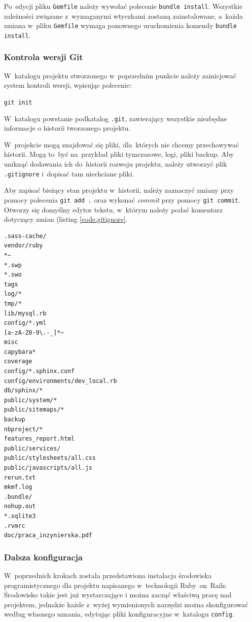 Po~edycji pliku \texttt{Gemfile} należy wywołać polecenie \texttt{bundle install}. Wszystkie zależności związane z~wymaganymi wtyczkami zostaną zainstalowane, a~każda zmiana w~pliku \texttt{Gemfile} wymaga ponownego uruchomienia komendy \texttt{bundle install}.

\subsubsection{Kontrola wersji Git}

W~katalogu projektu stworzonego w~poprzednim punkcie należy zainicjować system kontroli wersji, wpisując polecenie:


\verb+git init+


W~katalogu powstanie podkatalog \verb+.git+, zawierający wszystkie niezbędne informacje o historii tworzonego projektu.


W~projekcie mogą znajdować się pliki, dla~których nie chcemy przechowywać historii. Mogą to~być na~przykład pliki tymczasowe, logi, pliki backup. Aby uniknąć dodawania ich do~historii rozwoju projektu, należy utworzyć plik \texttt{.gitignore} i~dopisać tam niechciane pliki.


Aby zapisać bieżący stan projektu w~historii, należy zaznaczyć zmiany przy pomocy polecenia \verb+git add .+ oraz wykonać \textit{commit} przy pomocy \verb+git commit+. Otworzy się domyślny edytor tekstu, w~którym należy podać komentarz dotyczący zmian (listing \ref{code.gitignore}.

\begin{lstlisting}[label={code.gitignore}]
.sass-cache/
vendor/ruby
*~
*.swp
*.swo
tags
log/*
tmp/*
lib/mysql.rb
config/*.yml
[a-zA-Z0-9\.-_]*~
misc
capybara*
coverage
config/*.sphinx.conf
config/environments/dev_local.rb
db/sphinx/*
public/system/*
public/sitemaps/*
backup
nbproject/*
features_report.html
public/services/
public/stylesheets/all.css
public/javascripts/all.js
rerun.txt
mkmf.log
.bundle/
nohup.out
*.sqlite3
.rvmrc
doc/praca_inzynierska.pdf
\end{lstlisting}

\subsubsection{Dalsza konfiguracja}

W~poprzednich krokach została przedstawiona instalacja środowiska programistycznego dla projektu napisanego w~technologii Ruby~on~Rails. Środowisko takie jest już wystarczające i można zacząć właściwą pracę nad projektem, jednakże każde z~wyżej wymienionych narzędzi można skonfigurować według własnego uznania, edytując pliki konfiguracyjne w~katalogu \verb+config+.



